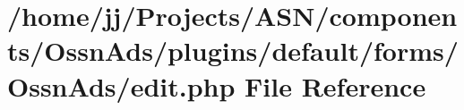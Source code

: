 \hypertarget{components_2_ossn_ads_2plugins_2default_2forms_2_ossn_ads_2edit_8php}{}\section{/home/jj/\+Projects/\+A\+S\+N/components/\+Ossn\+Ads/plugins/default/forms/\+Ossn\+Ads/edit.php File Reference}
\label{components_2_ossn_ads_2plugins_2default_2forms_2_ossn_ads_2edit_8php}
